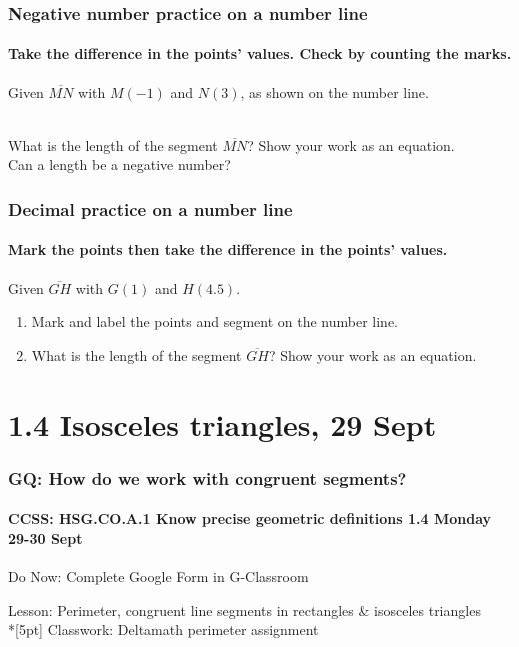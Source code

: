 \documentclass{beamer}
\begin{document}
  \frame
  {
    \frametitle{Negative number practice on a number line}
    \framesubtitle{Take the difference in the points' values. Check by counting the marks.}
    Given $\overline{MN}$ with $M(-1)$ and $N(3)$, as shown on the number line. \\[0.25cm]
       \\ \bigskip
  What is the length of the segment $\overline{MN}$? Show your work as an equation.\\[1.5cm]
  Can a length be a negative number? \vspace{2cm}  
  }

  \frame
  {
    \frametitle{Decimal practice on a number line}
    \framesubtitle{Mark the points then take the difference in the points' values.}
    Given $\overline{GH}$ with $G(1)$ and $H(4.5)$. \\[1.5cm]
      \begin{enumerate}
        \item Mark and label the points and segment on the number line.
        \item What is the length of the segment $\overline{GH}$? Show your work as an equation.
      \end{enumerate} \vspace{2cm}  
  }

  \section{1.4 Isosceles triangles, 29 Sept}
  \frame
  {
    \frametitle{GQ: How do we work with congruent segments?}
    \framesubtitle{CCSS: HSG.CO.A.1 Know precise geometric definitions  \hfill \alert{1.4 Monday 29-30 Sept}}
  
    \begin{block}{Do Now: Complete Google Form in G-Classroom}
    \end{block}
    Lesson: Perimeter, congruent line segments in rectangles \& isosceles triangles \\*[5pt]
    Classwork: Deltamath perimeter assignment
  }
\end{document}

